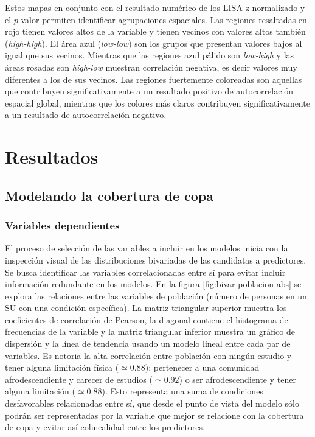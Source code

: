 \documentclass[12pt,a4paper,openany]{book}
\theoremstyle{definition}
\theoremstyle{definition}
\theoremstyle{definition}
\theoremstyle{remark}
\begin{document}
Estos mapas en conjunto con el resultado numérico de los LISA
z-normalizado y el \(p\)-valor permiten identificar agrupaciones
espaciales. Las regiones resaltadas en rojo tienen valores altos de la
variable y tienen vecinos con valores altos también (\emph{high-high}).
El área azul (\emph{low-low}) son los grupos que presentan valores bajos
al igual que sus vecinos. Mientras que las regiones azul pálido son
\emph{low-high} y las áreas rosadas son \emph{high-low} muestran
correlación negativa, es decir valores muy diferentes a los de sus
vecinos. Las regiones fuertemente coloreadas son aquellas que
contribuyen significativamente a un resultado positivo de
autocorrelación espacial global, mientras que los colores más claros
contribuyen significativamente a un resultado de autocorrelación
negativo.

\chapter{Resultados}\label{results}

\section{Modelando la cobertura de
copa}\label{modelando-la-cobertura-de-copa}

\subsection{Variables dependientes}\label{variables-dependientes}

El proceso de selección de las variables a incluir en los modelos inicia
con la inspección visual de las distribuciones bivariadas de las
candidatas a predictores. Se busca identificar las variables
correlacionadas entre sí para evitar incluir información redundante en
los modelos. En la figura \ref{fig:bivar-poblacion-abs} se explora las
relaciones entre las variables de población (número de personas en un SU
con una condición específica). La matriz triangular superior muestra los
coeficientes de correlación de Pearson, la diagonal contiene el
histograma de frecuencias de la variable y la matriz triangular inferior
muestra un gráfico de dispersión y la línea de tendencia usando un
modelo lineal entre cada par de variables. Es notoria la alta
correlación entre población con ningún estudio y tener alguna limitación
física (\(\simeq 0.88\)); pertenecer a una comunidad afrodescendiente y
carecer de estudios (\(\simeq0.92\)) o ser afrodescendiente y tener
alguna limitación (\(\simeq0.88\)). Esto representa una suma de
condiciones desfavorables relacionadas entre sí, que desde el punto de
vista del modelo sólo podrán ser representadas por la variable que mejor
se relacione con la cobertura de copa y evitar así colinealidad entre
los predictores.
\end{document}
